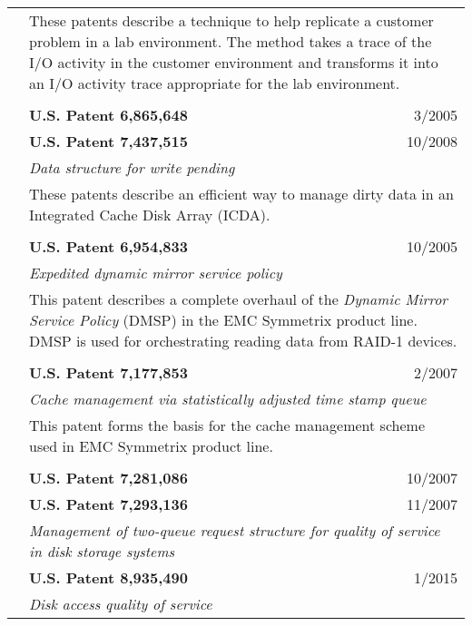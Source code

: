 \documentclass[10pt]{article}
\begin{document}
\begin{longtable}{p{ 90pt}p{299pt}r}
                    & \multicolumn{2}{p{4.5in}}{These patents describe a technique to help replicate a customer problem in a lab environment. The
						method takes a trace of the I/O activity in the customer environment and transforms it into
						an I/O activity trace appropriate for the lab environment.}\\
\\
                    & {\bf U.S. Patent 6,865,648} & 3/2005 \\
                    & {\bf U.S. Patent 7,437,515} & 10/2008 \\
                    & \multicolumn{2}{p{4.5in}}{\em Data structure for write pending} \\
                    & \multicolumn{2}{p{4.5in}}{These patents describe an efficient way to manage dirty data in an Integrated Cache Disk Array (ICDA).}\\
\\
                    & {\bf U.S. Patent 6,954,833} & 10/2005 \\
                    & \multicolumn{2}{p{4.5in}}{\em Expedited dynamic mirror service policy} \\
                    & \multicolumn{2}{p{4.5in}}{This patent describes a complete overhaul of the {\em Dynamic Mirror Service Policy} (DMSP) in the EMC Symmetrix
						product line. DMSP is used for orchestrating reading data from RAID-1 devices.}\\
\\
                    & {\bf U.S. Patent 7,177,853} & 2/2007 \\
                    & \multicolumn{2}{p{4.5in}}{\em Cache management via statistically adjusted time stamp queue} \\
                    & \multicolumn{2}{p{4.5in}}{This patent forms the basis for the cache management scheme used in EMC Symmetrix product line.}\\
\\
\newpage
                    & {\bf U.S. Patent 7,281,086} & 10/2007 \\
                    & {\bf U.S. Patent 7,293,136} & 11/2007 \\
                    & \multicolumn{2}{p{4.5in}}{\em Management of two-queue request structure for quality of service in disk storage systems} \\
                    & {\bf U.S. Patent 8,935,490} & 1/2015 \\
                    & \multicolumn{2}{p{4.5in}}{\em Disk access quality of service} \\

\end{longtable}
\end{document}
